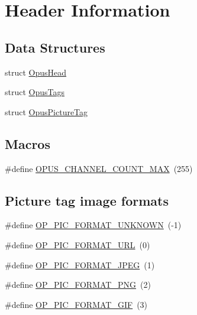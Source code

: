 \hypertarget{group__header__info}{}\section{Header Information}
\label{group__header__info}
\subsection*{Data Structures}
\begin{DoxyCompactItemize}
\item 
struct \hyperlink{struct_opus_head}{Opus\+Head}
\item 
struct \hyperlink{struct_opus_tags}{Opus\+Tags}
\item 
struct \hyperlink{struct_opus_picture_tag}{Opus\+Picture\+Tag}
\end{DoxyCompactItemize}
\subsection*{Macros}
\begin{DoxyCompactItemize}
\item 
\#define \hyperlink{group__header__info_gad6f0329582430a828244045ac85a5417}{O\+P\+U\+S\+\_\+\+C\+H\+A\+N\+N\+E\+L\+\_\+\+C\+O\+U\+N\+T\+\_\+\+M\+AX}~(255)
\end{DoxyCompactItemize}
\subsection*{Picture tag image formats}
\begin{DoxyCompactItemize}
\item 
\#define \hyperlink{group__header__info_gade2f09dce6330529fc3c96d1740df653}{O\+P\+\_\+\+P\+I\+C\+\_\+\+F\+O\+R\+M\+A\+T\+\_\+\+U\+N\+K\+N\+O\+WN}~(-\/1)
\item 
\#define \hyperlink{group__header__info_gaac4ef30a33caf090b9b1a5ada8f48204}{O\+P\+\_\+\+P\+I\+C\+\_\+\+F\+O\+R\+M\+A\+T\+\_\+\+U\+RL}~(0)
\item 
\#define \hyperlink{group__header__info_gaf75ae037b78a4a048359261439395450}{O\+P\+\_\+\+P\+I\+C\+\_\+\+F\+O\+R\+M\+A\+T\+\_\+\+J\+P\+EG}~(1)
\item 
\#define \hyperlink{group__header__info_ga703554b177ae75bd6999bbd30d485d3f}{O\+P\+\_\+\+P\+I\+C\+\_\+\+F\+O\+R\+M\+A\+T\+\_\+\+P\+NG}~(2)
\item 
\#define \hyperlink{group__header__info_gaa7d5e8cb675cb2da840f258b761e7781}{O\+P\+\_\+\+P\+I\+C\+\_\+\+F\+O\+R\+M\+A\+T\+\_\+\+G\+IF}~(3)
\end{DoxyCompactItemize}
